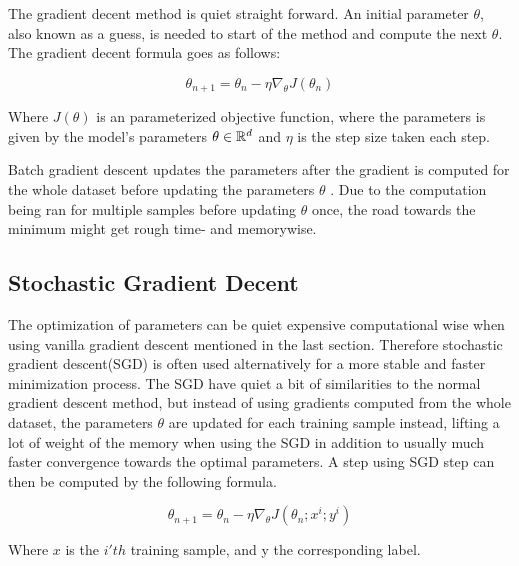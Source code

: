 \documentclass[../main.tex]{subfiles}
\begin{document}
The gradient decent method is quiet straight forward. An initial parameter $\theta$, also known as a guess, is needed to start of the method and compute the next \ensuremath{\theta}. The gradient decent formula goes as follows:

\begin{equation*}
    \theta_{n+1}=\theta_n -\eta \nabla_\theta J(\theta_n)
\label{eq:20}
\end{equation*}

Where $J(\theta)$ is an parameterized objective function, where the parameters is given by the model's parameters $\theta\in\mathbb{R}^d$ and \ensuremath{\eta} is the step size taken each step.

Batch gradient descent updates the parameters after the gradient is computed for the whole dataset before updating the parameters $\theta$ \cite{ruder2017overview}. Due to the computation being ran for multiple samples before updating $\theta$ once, the road towards the minimum might get rough time- and memorywise.

\subsection{Stochastic Gradient Decent}
The optimization of parameters can be quiet expensive computational wise when using vanilla gradient descent mentioned in the last section. Therefore stochastic gradient descent(SGD) is often used alternatively for a more stable and faster minimization process. The SGD have quiet a bit of similarities to the normal gradient descent method, but instead of using gradients computed from the whole dataset, the parameters $\theta$ are updated for each training sample instead, lifting a lot of weight of the memory when using the SGD in addition to usually much faster convergence towards the optimal parameters. A step using SGD step can then be computed by the following formula.

\begin{equation*}
    \theta_{n+1}=\theta_n -\eta \nabla_\theta J(\theta_n;x^{i}; y^{i})
    \label{eq:SGD}
\end{equation*}

Where $x$ is the $i'th$ training sample, and y the corresponding label.
\end{document}
